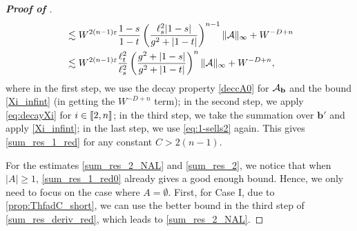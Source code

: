 \begin{proof}[\bf Proof of ]
\begin{align}
    &\lesssim W^{2(n-1) \e}\frac{1-s}{1-t}\left(\frac{\ell_s^2|1-s|}{\ilambda^2+|1-t|}\right)^{n-1} \|\cal A\|_\infty + W^{-D+n} \nonumber\\
    &\lesssim  W^{2(n-1) \e}\frac{\ell_t^2}{\ell_s^2}\left(\frac{\ilambda^2+|1-s|}{\ilambda^2+|1-t|}\right)^{n} \|\cal A\|_\infty + W^{-D+n}, \label{sum_res_deriv_red}
\end{align} 
where in the first step, we use the decay property \eqref{deccA0} for $\cal A_{\mathbf b}$ and the bound \eqref{Xi_infint} (in getting the $W^{-D+n}$ term); in the second step, we apply \eqref{eq:decayXi} for $i\in\qqq{2,n}$; in the third step, we take the summation over $\mathbf b'$ and apply \eqref{Xi_infint}; in the last step, we use \eqref{eq:1-sells2} again.  This gives \eqref{sum_res_1_red} for any constant $C>2(n-1)$.  


For the estimates \eqref{sum_res_2_NAL} and \eqref{sum_res_2}, %
we notice that when $|A| \ge 1$, \eqref{sum_res_1_red0} already gives a good enough bound. 
Hence, we only need to focus on the case where $A=\emptyset$. 
First, for Case I, due to \eqref{prop:ThfadC_short}, we can use the better bound  in the third step of \eqref{sum_res_deriv_red}, which leads to \eqref{sum_res_2_NAL}. 


\end{proof}
